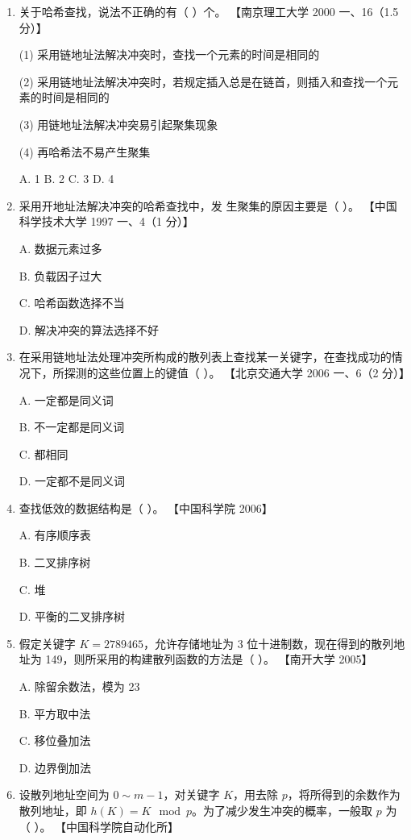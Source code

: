 \documentclass[lang=cn,newtx,10pt,scheme=chinese]{elegantbook}
\begin{document}
\begin{enumerate}
    \item 关于哈希查找，说法不正确的有（ ）个。  
    【南京理工大学 2000 一、16（1.5 分）】  

    (1) 采用链地址法解决冲突时，查找一个元素的时间是相同的  

    (2) 采用链地址法解决冲突时，若规定插入总是在链首，则插入和查找一个元素的时间是相同的  

    (3) 用链地址法解决冲突易引起聚集现象  

    (4) 再哈希法不易产生聚集  

    A. 1 \quad B. 2 \quad C. 3 \quad D. 4  

    \item 采用开地址法解决冲突的哈希查找中，发
    生聚集的原因主要是（ ）。  
    【中国科学技术大学 1997 一、4（1 分）】  

    A. 数据元素过多  

    B. 负载因子过大  

    C. 哈希函数选择不当  

    D. 解决冲突的算法选择不好  

    \item 在采用链地址法处理冲突所构成的散列表上查找某一关键字，在查找成功的情况下，所探测的这些位置上的键值（ ）。  
    【北京交通大学 2006 一、6（2 分）】  

    A. 一定都是同义词  

    B. 不一定都是同义词  

    C. 都相同  

    D. 一定都不是同义词  

    \item 查找低效的数据结构是（ ）。  
    【中国科学院 2006】  

    A. 有序顺序表  

    B. 二叉排序树  

    C. 堆  

    D. 平衡的二叉排序树  

    \item 假定关键字 $K = 2789465$，允许存储地址为 3 位十进制数，现在得到的散列地址为 149，则所采用的构建散列函数的方法是（ ）。  
    【南开大学 2005】  

    A. 除留余数法，模为 23  

    B. 平方取中法  

    C. 移位叠加法  

    D. 边界倒加法  
    \item 设散列地址空间为 $0 \sim m-1$，对关键字 $K$，用去除 $p$，将所得到的余数作为散列地址，即 $h(K) = K \mod p$。为了减少发生冲突的概率，一般取 $p$ 为（ ）。  
    【中国科学院自动化所】


\end{enumerate}
\end{document}
